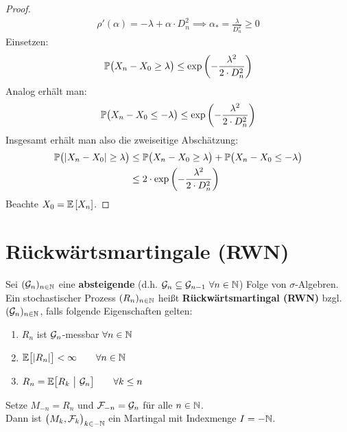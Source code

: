\begin{proof}
\begin{align*}
\rho'(\alpha)=-\lambda+\alpha\cdot D_n^2\implies\alpha_\ast=\frac{\lambda}{D_n^2}\geq0
\end{align*}
Einsetzen:
\begin{align*}
\P\big(X_n-X_0\geq\lambda\big)
\leq\exp\left(-\frac{\lambda^2}{2\cdot D_n^2}\right)
\end{align*}
Analog erhält man:
\begin{align*}
\P\big(X_n-X_0\leq-\lambda\big)
\leq\exp\left(-\frac{\lambda^2}{2\cdot D_n^2}\right)
\end{align*}
Insgesamt erhält man also die zweiseitige Abschätzung:
\begin{align*}
\P\big(|X_n-X_0|\geq\lambda\big)
&\leq
\P\big(X_n-X_0\geq\lambda\big) +
\P\big(X_n-X_0\leq-\lambda\big) \\
&\leq2\cdot\exp\left(-\frac{\lambda^2}{2\cdot D_n^2}\right)
\end{align*}
Beachte $X_0=\E\left[X_n\right]$.
\end{proof}

\setcounter{section}{1}
\section{Rückwärtsmartingale (RWN)} %
\begin{defi}
	Sei $(\G_n)_{n\in\N}$ eine \textbf{absteigende} (d.h. $\G_{n}\subseteq\G_{n-1}~\forall n\in\N$) Folge von $\sigma$-Algebren.\\
Ein stochastischer Prozess $(R_n)_{n\in\N}$ heißt \textbf{Rückwärtsmartingal (RWN)} bzgl. $(\G_n)_{n\in\N}$, falls folgende Eigenschaften gelten:
\begin{enumerate}
\item $R_n$ ist $\G_n$-messbar $\forall n\in\N$
\item $\begin{aligned}
\E\big[|R_n|\big]<\infty\qquad\forall n\in\N
\end{aligned}$
\item $\begin{aligned}
R_n=\E\big[R_k~\big|~\G_n\big]\qquad\forall k\leq n
\end{aligned}$
\end{enumerate} 
\end{defi}

\begin{bemerkung}
Setze $M_{-n}=R_n$  und $\F_{-n}=\G_n$ für alle $n\in\N$.\\
Dann ist $\big(M_k,\F_k\big)_{k\in-\N}$ ein Martingal mit Indexmenge $I=-\N$.
\end{bemerkung}

